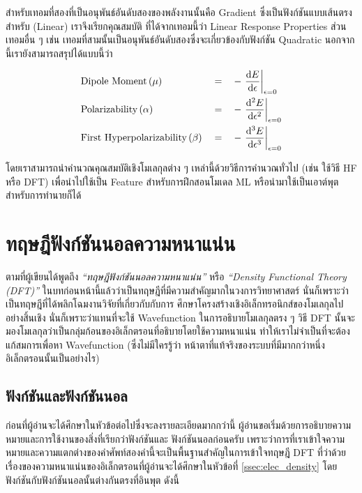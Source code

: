 \noindent สำหรับเทอมที่สองที่เป็นอนุพันธ์อันดับสองของพลังงานนั้นคือ Gradient ซึ่งเป็นฟังก์ชันแบบเส้นตรงสำหรับ (Linear) เราจึงเรียกคุณสมบัติ%
ที่ได้จากเทอมนี้ว่า Linear Response Properties ส่วนเทอมอื่น ๆ เช่น เทอมที่สามนั้นเป็นอนุพันธ์อันดับสองซึ่งจะเกี่ยวข้องกับฟังก์ชัน Quadratic  
นอกจากนี้เรายังสามารถสรุปได้แบบนี้ว่า

\begin{align*}
    &\text{Dipole Moment}\,(\mu) &&= &&-\evaluated{\dv{E}{\epsilon}}_{\epsilon = 0} \\
    &\text{Polarizability}\,(\alpha) &&= &&-\evaluated{\dv[2]{E}{\epsilon}}_{\epsilon = 0} \\
    &\text{First Hyperpolarizability}\,(\beta) &&= &&-\evaluated{\dv[3]{E}{\epsilon}}_{\epsilon = 0}
\end{align*}

โดยเราสามารถนำคำนวณคุณสมบัติเชิงโมเลกุลต่าง ๆ เหล่านี้ด้วยวิธีการคำนวณทั่วไป (เช่น ใช้วิธี HF หรือ DFT) เพื่อนำไปใช้เป็น Feature 
สำหรับการฝึกสอนโมเดล ML หรือนำมาใช้เป็นเอาต์พุตสำหรับการทำนายก็ได้

\section{ทฤษฎีฟังก์ชันนอลความหนาแน่น}
\label{sec:dft}

ตามที่ผู้เขียนได้พูดถึง \textit{\enquote{ทฤษฎีฟังก์ชันนอลความหนาแน่น}} หรือ \textit{\enquote{Density Functional Theory 
(DFT)}} ในบทก่อนหน้านี้แล้วว่าเป็นทฤษฎีที่มีความสำคัญมากในวงการวิทยาศาสตร์ นั่นก็เพราะว่าเป็นทฤษฎีที่ได้พลิกโฉมงานวิจัยที่เกี่ยวกับกับการ%
ศึกษาโครงสร้างเชิงอิเล็กทรอนิกส์ของโมเลกุลไปอย่างสิ้นเชิง นั่นก็เพราะว่าแทนที่จะใช้ Wavefunction ในการอธิบายโมเลกุลตรง ๆ วิธี DFT นั้นจะ%
มองโมเลกุลว่าเป็นกลุ่มก้อนของอิเล็กตรอนที่อธิบายโดยใช้ความหนาแน่น ทำให้เราไม่จำเป็นที่จะต้องแก้สมการเพื่อหา Wavefunction (ซึ่งไม่มีใครรู้ว่า%
หน้าตาที่แท้จริงของระบบที่มีมากกว่าหนึ่งอิเล็กตรอนนั้นเป็นอย่างไร)

\subsection{ฟังก์ชันและฟังก์ชันนอล}
\label{ssec:function_functional}

ก่อนที่ผู้อ่านจะได้ศึกษาในหัวข้อต่อไปซึ่งจะลงรายละเอียดมากกว่านี้ ผู้อ่านขอเริ่มด้วยการอธิบายความหมายและการใช้งานของสิ่งที่เรียกว่าฟังก์ชันและ%
ฟังก์ชันนอลก่อนครับ เพราะว่าการที่เราเข้าใจความหมายและความแตกต่างของคำศัพท์สองคำนี้จะเป็นพื้นฐานสำคัญในการเข้าใจทฤษฎี DFT ที่ว่าด้วย%
เรื่องของความหนาแน่นของอิเล็กตรอนที่ผู้อ่านจะได้ศึกษาในหัวข้อที่ \ref{ssec:elec_density} โดยฟังก์ชันกับฟังก์ชันนอลนั้นต่างกันตรงที่อินพุต 
ดังนี้

